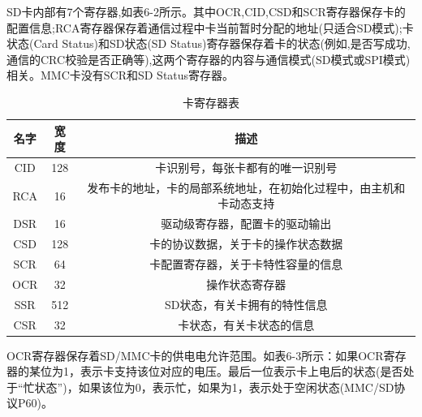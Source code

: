 SD卡内部有7个寄存器,如表6-2所示。其中OCR,CID,CSD和SCR寄存器保存卡的配置信息;RCA寄存器保存着通信过程中卡当前暂时分配的地址(只适合SD模式);卡状态(Card Status)和SD状态(SD Status)寄存器保存着卡的状态(例如,是否写成功,通信的CRC校验是否正确等),这两个寄存器的内容与通信模式(SD模式或SPI模式)相关。MMC卡没有SCR和SD Status寄存器。\\
\begin{table}[h]
    \centering
\begin{tabular}{|c|c|c|}    

    \hline
    名字	&宽度	&描述\\
    \hline
    CID	&128	&卡识别号，每张卡都有的唯一识别号\\
    \hline
    RCA	&16	&发布卡的地址，卡的局部系统地址，在初始化过程中，由主机和卡动态支持\\
    \hline
    DSR	&16&	驱动级寄存器，配置卡的驱动输出\\
    \hline
    CSD	&128&	卡的协议数据，关于卡的操作状态数据\\
    \hline
    SCR	&64	&卡配置寄存器，关于卡特性容量的信息\\
    \hline
    OCR	&32	&操作状态寄存器\\
    \hline
    SSR	&512&	SD状态，有关卡拥有的特性信息\\
    \hline
    CSR	&32	&卡状态，有关卡状态的信息\\
    \hline
\end{tabular}
\caption{卡寄存器表}
\end{table}

OCR寄存器保存着SD/MMC卡的供电电允许范围。如表6-3所示：如果OCR寄存器的某位为1，表示卡支持该位对应的电压。最后一位表示卡上电后的状态(是否处于“忙状态”)，如果该位为0，表示忙，如果为1，表示处于空闲状态(MMC/SD协议P60)。\\

